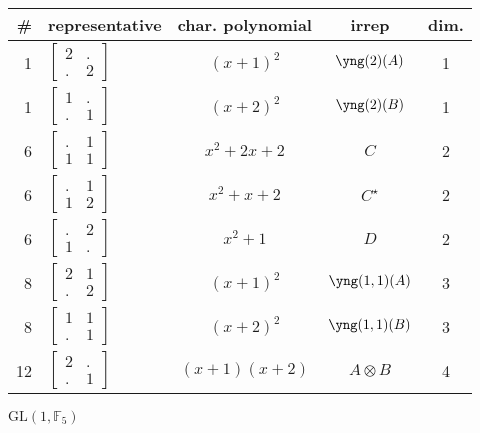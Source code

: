 \documentclass[11pt,oneside]{article}
\newcommand{\GL}{\mathrm{GL}}
\newcommand{\Field}{\mathbb{F}}
\newcommand{\tensor}{\otimes}
\begin{document}
\begin{center}
\begin{tabular}{r|l|c|c|c}
\# & representative & char. polynomial & irrep & dim. \\
\hline
1  &  $\begin{bmatrix}2&.\\.&2\end{bmatrix}$   & $(x+1)^2$  & $\yng(2)(A)$ & 1  \\
1  &  $\begin{bmatrix}1&.\\.&1\end{bmatrix}$   & $(x+2)^2$  & $\yng(2)(B)$ & 1  \\
6  &  $\begin{bmatrix}.&1\\1&1\end{bmatrix}$   & $x^2+2x+2$  & $C$ & 2  \\
6  &  $\begin{bmatrix}.&1\\1&2\end{bmatrix}$   & $x^2+x+2$  & $C^\star$ & 2  \\
6  &  $\begin{bmatrix}.&2\\1&.\end{bmatrix}$   & $x^2+1$  & $D$ & 2  \\
8  &  $\begin{bmatrix}2&1\\.&2\end{bmatrix}$   & $(x+1)^2$  & $\yng(1,1)(A)$ & 3  \\
8  &  $\begin{bmatrix}1&1\\.&1\end{bmatrix}$   & $(x+2)^2$  & $\yng(1,1)(B)$ & 3  \\
12  &  $\begin{bmatrix}2&.\\.&1\end{bmatrix}$   & $(x+1)(x+2)$  & $A\tensor B$ & 4  \\
\end{tabular}
\end{center}



$\GL(1,\Field_5)$
\end{document}
